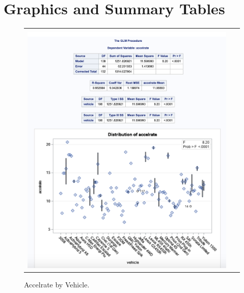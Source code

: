 \documentclass[acmsmall]{acmart}
\begin{document}
\section{Graphics and Summary Tables}
\begin{figure}[H] %
	\centering
	\begin{tabular}{| p{}|}
	\hline
	\\
	\includegraphics[width=0.95\textwidth]{../graphics/AccelrateByVehicle}\\
	\hline
	\end{tabular}	
	\caption{Accelrate by Vehicle.} %
	\label{fig:ABV}
\end{figure}
\end{document}
